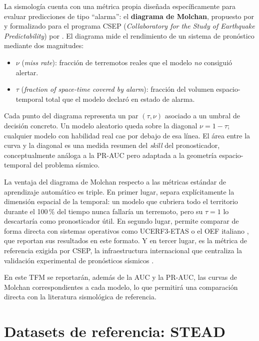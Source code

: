 La sismología cuenta con una métrica propia diseñada específicamente para evaluar predicciones de tipo ``alarma'': el \textbf{diagrama de Molchan}, propuesto por \citet{molchan1991structure} y formalizado para el programa CSEP (\textit{Collaboratory for the Study of Earthquake Predictability}) por \citet{zechar2008testing}. El diagrama mide el rendimiento de un sistema de pronóstico mediante dos magnitudes:

\begin{itemize}
  \item $\nu$ (\textit{miss rate}): fracción de terremotos reales que el modelo \emph{no} consiguió alertar.
  \item $\tau$ (\textit{fraction of space-time covered by alarm}): fracción del volumen espacio-temporal total que el modelo declaró en estado de alarma.
\end{itemize}

Cada punto del diagrama representa un par $(\tau, \nu)$ asociado a un umbral de decisión concreto. Un modelo aleatorio queda sobre la diagonal $\nu = 1 - \tau$; cualquier modelo con habilidad real cae por debajo de esa línea. El área entre la curva y la diagonal es una medida resumen del \textit{skill} del pronosticador, conceptualmente análoga a la PR-AUC pero adaptada a la geometría espacio-temporal del problema sísmico.

La ventaja del diagrama de Molchan respecto a las métricas estándar de aprendizaje automático es triple. En primer lugar, separa explícitamente la dimensión espacial de la temporal: un modelo que cubriera todo el territorio durante el 100\,\% del tiempo nunca fallaría un terremoto, pero su $\tau = 1$ lo descartaría como pronosticador útil. En segundo lugar, permite comparar de forma directa con sistemas operativos como UCERF3-ETAS \citep{field2017ucerf3etas} o el OEF italiano \citep{marzocchi2014oef}, que reportan sus resultados en este formato. Y en tercer lugar, es la métrica de referencia exigida por CSEP, la infraestructura internacional que centraliza la validación experimental de pronósticos sísmicos \citep{zechar2008testing}.

En este TFM se reportarán, además de la AUC y la PR-AUC, las curvas de Molchan correspondientes a cada modelo, lo que permitirá una comparación directa con la literatura sismológica de referencia.

\section{Datasets de referencia: STEAD}
\label{stead}

